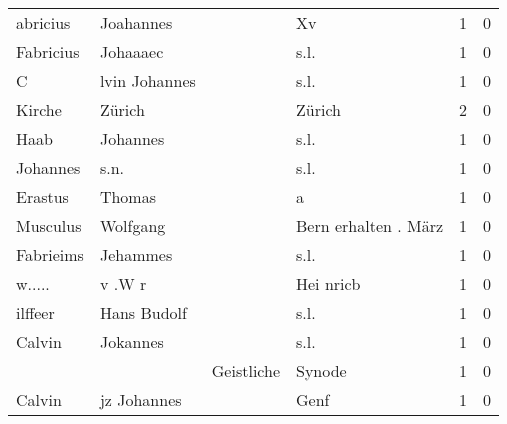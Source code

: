 \documentclass[10pt,a4paper,landscape]{article}
\begin{document}
\begin{longtable}{llllrr}
                 abricius &                          Joahannes &             &                                          Xv &          1 &         0 \\
                Fabricius &                           Johaaaec &             &                                        s.l. &          1 &         0 \\
                        C &                      lvin Johannes &             &                                        s.l. &          1 &         0 \\
                   Kirche &                             Zürich &             &                                      Zürich &          2 &         0 \\
                     Haab &                           Johannes &             &                                        s.l. &          1 &         0 \\
                 Johannes &                               s.n. &             &                                        s.l. &          1 &         0 \\
                  Erastus &                             Thomas &             &                                           a &          1 &         0 \\
                 Musculus &                           Wolfgang &             &                        Bern erhalten . März &          1 &         0 \\
                Fabrieims &                           Jehammes &             &                                        s.l. &          1 &         0 \\
                   w..... &                             v .W r &             &                                   Hei nricb &          1 &         0 \\
                  ilffeer &                        Hans Budolf &             &                                        s.l. &          1 &         0 \\
                   Calvin &                           Jokannes &             &                                        s.l. &          1 &         0 \\
                          &                                    &  Geistliche &                                      Synode &          1 &         0 \\
                   Calvin &                        jz Johannes &             &                                        Genf &          1 &         0 \\

\end{longtable}
\end{document}
